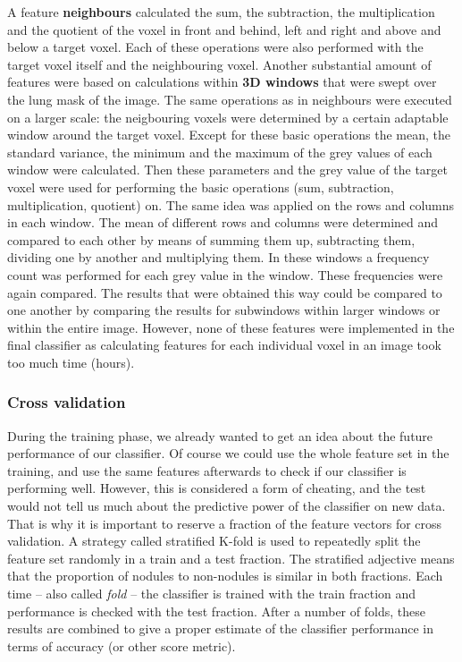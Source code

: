 A feature \textbf{neighbours} calculated the sum, the subtraction, the
multiplication and the quotient of the voxel in front and behind, left and right
and above and below a target voxel. Each of these operations were also
performed with the target voxel itself and the neighbouring voxel. Another
substantial amount of features were based on calculations within \textbf{3D
windows} that were swept over the lung mask of the image. The same operations
as in neighbours were executed on a larger scale: the neigbouring voxels were
determined by a certain adaptable window around the target voxel. Except for
these basic operations the mean, the standard variance, the minimum and the
maximum of the grey values of each window were calculated. Then these parameters
and the grey value of the target voxel were used for performing the basic
operations (sum, subtraction, multiplication, quotient) on. The same idea was
applied on the rows and columns in each window. The mean of different rows and
columns were determined and compared to each other by means of summing them up,
subtracting them, dividing one by another and multiplying them. In these windows
a frequency count was performed for each grey value in the window. These
frequencies were again compared. The results that were obtained this way could
be compared to one another by comparing the results for subwindows within larger
windows or within the entire image. However, none of these features were
implemented in the final classifier as calculating features for each individual
voxel in an image took too much time (hours).

\subsubsection{Cross validation}
During the training phase, we already wanted to get an idea about the future
performance of our classifier. Of course we could use the whole feature set in
the training, and use the same features afterwards to check if our classifier is
performing well. However, this is considered a form of cheating, and the test
would not tell us much about the predictive power of the classifier on new data.
That is why it is important to reserve a fraction of the feature vectors for
cross validation. A strategy called stratified K-fold is used to repeatedly
split the feature set randomly in a train and a test fraction.
The stratified adjective means that the proportion of nodules to non-nodules is
similar in both fractions. Each time -- also called \textit{fold} -- the
classifier is trained with the train fraction and performance is checked with
the test fraction. After a number of folds, these results are combined to give a
proper estimate of the classifier performance in terms of accuracy (or other
score metric).

